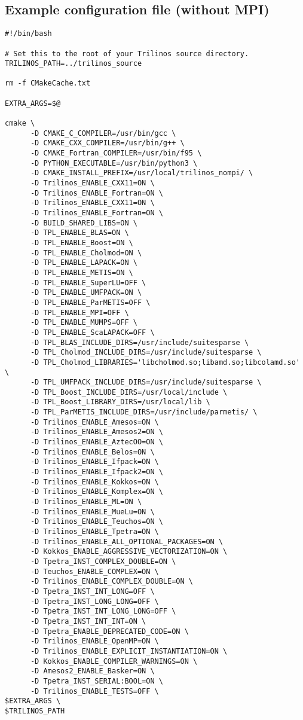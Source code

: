 \subsection{Example configuration file (without MPI)}
\begin{verbatim}
#!/bin/bash

# Set this to the root of your Trilinos source directory.
TRILINOS_PATH=../trilinos_source

rm -f CMakeCache.txt

EXTRA_ARGS=$@

cmake \
      -D CMAKE_C_COMPILER=/usr/bin/gcc \
      -D CMAKE_CXX_COMPILER=/usr/bin/g++ \
      -D CMAKE_Fortran_COMPILER=/usr/bin/f95 \
      -D PYTHON_EXECUTABLE=/usr/bin/python3 \
      -D CMAKE_INSTALL_PREFIX=/usr/local/trilinos_nompi/ \
      -D Trilinos_ENABLE_CXX11=ON \
      -D Trilinos_ENABLE_Fortran=ON \
      -D Trilinos_ENABLE_CXX11=ON \
      -D Trilinos_ENABLE_Fortran=ON \
      -D BUILD_SHARED_LIBS=ON \
      -D TPL_ENABLE_BLAS=ON \
      -D TPL_ENABLE_Boost=ON \
      -D TPL_ENABLE_Cholmod=ON \
      -D TPL_ENABLE_LAPACK=ON \
      -D TPL_ENABLE_METIS=ON \
      -D TPL_ENABLE_SuperLU=OFF \
      -D TPL_ENABLE_UMFPACK=ON \
      -D TPL_ENABLE_ParMETIS=OFF \
      -D TPL_ENABLE_MPI=OFF \
      -D TPL_ENABLE_MUMPS=OFF \
      -D TPL_ENABLE_ScaLAPACK=OFF \
      -D TPL_BLAS_INCLUDE_DIRS=/usr/include/suitesparse \
      -D TPL_Cholmod_INCLUDE_DIRS=/usr/include/suitesparse \
      -D TPL_Cholmod_LIBRARIES='libcholmod.so;libamd.so;libcolamd.so' \
      -D TPL_UMFPACK_INCLUDE_DIRS=/usr/include/suitesparse \
      -D TPL_Boost_INCLUDE_DIRS=/usr/local/include \
      -D TPL_Boost_LIBRARY_DIRS=/usr/local/lib \
      -D TPL_ParMETIS_INCLUDE_DIRS=/usr/include/parmetis/ \
      -D Trilinos_ENABLE_Amesos=ON \
      -D Trilinos_ENABLE_Amesos2=ON \
      -D Trilinos_ENABLE_AztecOO=ON \
      -D Trilinos_ENABLE_Belos=ON \
      -D Trilinos_ENABLE_Ifpack=ON \
      -D Trilinos_ENABLE_Ifpack2=ON \
      -D Trilinos_ENABLE_Kokkos=ON \
      -D Trilinos_ENABLE_Komplex=ON \
      -D Trilinos_ENABLE_ML=ON \
      -D Trilinos_ENABLE_MueLu=ON \
      -D Trilinos_ENABLE_Teuchos=ON \
      -D Trilinos_ENABLE_Tpetra=ON \
      -D Trilinos_ENABLE_ALL_OPTIONAL_PACKAGES=ON \
      -D Kokkos_ENABLE_AGGRESSIVE_VECTORIZATION=ON \
      -D Tpetra_INST_COMPLEX_DOUBLE=ON \
      -D Teuchos_ENABLE_COMPLEX=ON \
      -D Trilinos_ENABLE_COMPLEX_DOUBLE=ON \
      -D Tpetra_INST_INT_LONG=OFF \
      -D Tpetra_INST_LONG_LONG=OFF \
      -D Tpetra_INST_INT_LONG_LONG=OFF \
      -D Tpetra_INST_INT_INT=ON \
      -D Tpetra_ENABLE_DEPRECATED_CODE=ON \
      -D Trilinos_ENABLE_OpenMP=ON \
      -D Trilinos_ENABLE_EXPLICIT_INSTANTIATION=ON \
      -D Kokkos_ENABLE_COMPILER_WARNINGS=ON \
      -D Amesos2_ENABLE_Basker=ON \
      -D Tpetra_INST_SERIAL:BOOL=ON \
      -D Trilinos_ENABLE_TESTS=OFF \
$EXTRA_ARGS \
$TRILINOS_PATH
\end{verbatim}



